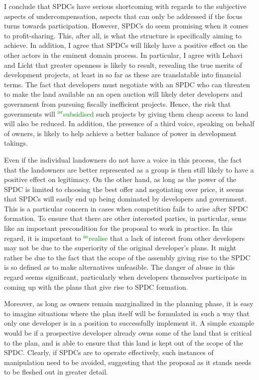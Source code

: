 \documentclass[12pt,a4paper]{book} %
\newcommand{\isr}[1]{\textcolor{green}{$^{\textrm{isr}}${#1}}}
\begin{document}
I conclude that SPDCs have serious shortcoming with regards to the subjective aspects of undercompensation, aspects that can only be addressed if the focus turns towards participation. However, SPDCs do seem promising when it comes to profit-sharing. This, after all, is what the structure is specifically aiming to achieve. In addition, I agree that SPDCs will likely have a positive effect on the other actors in the eminent domain process. In particular, I agree with Lehavi and Licht that greater openness is likely to result, revealing the true merits of development projects, at least in so far as these are translatable into financial terms. The fact that developers must negotiate with an SPDC who can threaten to make the land available an an open auction will likely deter developers and government from pursuing fiscally inefficient projects. Hence, the risk that governments will \isr{subsidised} such projects by giving them cheap access to land will also be reduced. In addition, the presence of a third voice, speaking on behalf of owners, is likely to help achieve a better balance of power in development takings. 

Even if the individual landowners do not have a voice in this process, the fact that the landowners are better represented as a group is then still likely to have a positive effect on legitimacy. On the other hand, as long as the power of the SPDC is limited to choosing the best offer and negotiating over price, it seems that SPDCs will easily end up being dominated by developers and government. This is a particular concern in cases when competition fails to arise after SPDC formation. To ensure that there are other interested parties, in particular, sems like an important precondition for the proposal to work in practice. In this regard, it is important to \isr{realise} that a lack of interest from other developers may not be due to the superiority of the original developer's plans. It might rather be due to the fact that the scope of the assembly giving rise to the SPDC is so defined as to make alternatives unfeasible. The danger of abuse in this regard seems significant, particularly when developers themselves participate in coming up with the plans that give rise to SPDC formation. 

Moreover, as long as owners remain marginalized in the planning phase, it is easy to imagine situations where the plan itself will be formulated in such a way that only one developer is in a position to successfully implement it. A simple example would be if a prospective developer already owns some of the land that is critical to the plan, and is able to ensure that this land is kept out of the scope of the SPDC. Clearly, if SPDCs are to operate effectively, such instances of manipulation need to be avoided, suggesting that the proposal as it stands needs to be fleshed out in greater detail.
\end{document}

